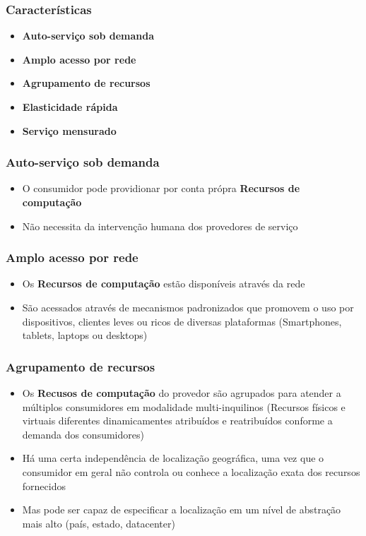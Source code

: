 \begin{frame}
	\frametitle{Características}
	\begin{itemize}
		\item \textbf{Auto-serviço sob demanda}
		\item \textbf{Amplo acesso por rede}
		\item \textbf{Agrupamento de recursos}
		\item \textbf{Elasticidade rápida}
		\item \textbf{Serviço mensurado}
	\end{itemize}
\end{frame}

\begin{frame}
	\frametitle{Auto-serviço sob demanda}
	\begin{itemize}
		\item O consumidor pode providionar por conta própra \textbf{Recursos de computação}
		\item Não necessita da intervenção humana dos provedores de serviço
	\end{itemize}
\end{frame}

\begin{frame}
	\frametitle{Amplo acesso por rede}
	\begin{itemize}
		\item Os \textbf{Recursos de computação} estão disponíveis através da rede
		\item São acessados através de mecanismos padronizados que promovem o uso por dispositivos, clientes leves ou ricos de diversas plataformas (Smartphones, tablets, laptops ou desktops)
	\end{itemize}
\end{frame}

\begin{frame}
	\frametitle{Agrupamento de recursos}
	\begin{itemize}
		\item Os \textbf{Recusos de computação} do provedor são agrupados para atender a múltiplos consumidores em modalidade multi-inquilinos (Recursos físicos e virtuais diferentes dinamicamentes atribuídos e reatribuídos conforme a demanda dos consumidores)
		\item Há uma certa independência de localização geográfica, uma vez que o consumidor em geral não controla ou conhece a localização exata dos recursos fornecidos
		\item Mas pode ser capaz de especificar a localização em um nível de abstração mais alto (país, estado, datacenter)
	\end{itemize}
\end{frame}

